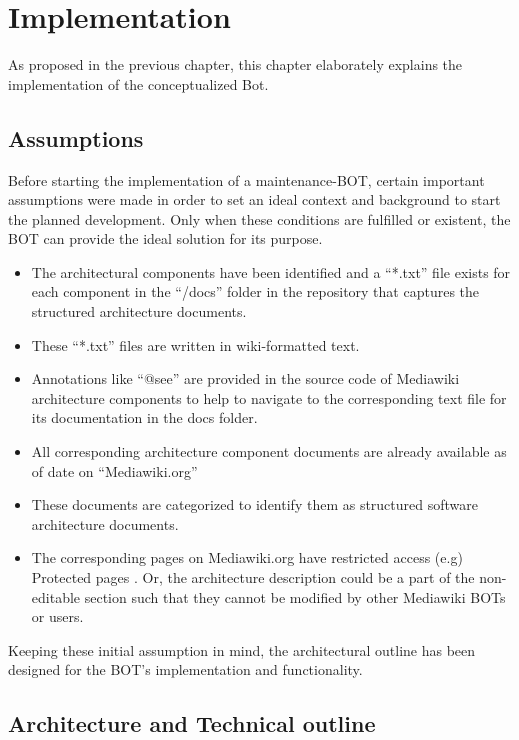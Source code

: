 \chapter{Implementation}\label{chapter:Implementation}
\indent As proposed in the previous chapter, this chapter elaborately explains the implementation of the conceptualized Bot. 
\section{Assumptions}

\indent Before starting the implementation of a maintenance-BOT, certain important assumptions were made in order to set an ideal context and background to start the planned development. Only when these conditions are fulfilled or existent, the BOT can provide the ideal solution for its purpose.
\begin{itemize}
\item The architectural components have been identified and a \enquote{*.txt} file exists for each component in the \enquote{/docs} folder in the repository that captures the structured architecture documents.
\item These \enquote{*.txt} files are written in wiki-formatted text.
\item Annotations like \enquote{@see} are provided in the source code of Mediawiki architecture components to help to navigate to the corresponding text file for its documentation in the docs folder.
\item All corresponding architecture component documents are already available as of date on \enquote{Mediawiki.org}
\item These documents are categorized to identify them as structured software architecture documents.
\item The corresponding pages on Mediawiki.org have restricted access (e.g) Protected pages \cite{help_pp}. Or, the architecture description could be a part of the non-editable section such that they cannot be modified by other Mediawiki BOTs or users.
\end{itemize}

Keeping these initial assumption in mind, the architectural outline has been designed for the BOT's implementation and functionality. 

\section{Architecture and Technical outline}

